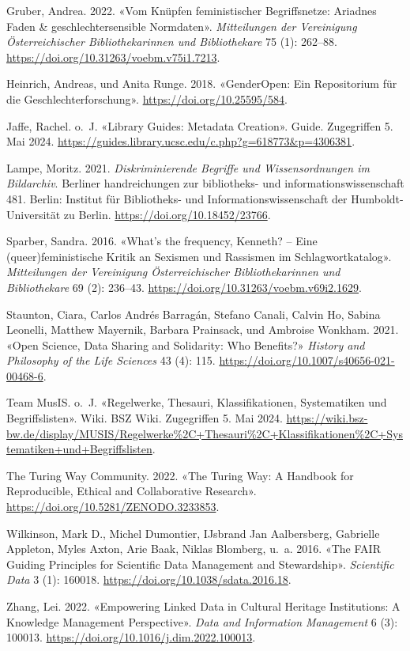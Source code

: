 \documentclass[
  letterpaper,
  DIV=11,
  numbers=noendperiod]{scrartcl}
\newlength{\cslhangindent}
\newenvironment{CSLReferences}[2] %
 {\begin{list}{}{%
  \setlength{\itemindent}{0pt}
  \setlength{\leftmargin}{0pt}
  \setlength{\parsep}{0pt}
  \ifodd #1
   \setlength{\leftmargin}{\cslhangindent}
   \setlength{\itemindent}{-1\cslhangindent}
  \fi
  \setlength{\itemsep}{#2\baselineskip}}}
 {\end{list}}
\begin{document}
\begin{CSLReferences}{1}{0}
Gruber, Andrea. 2022. {«Vom Knüpfen feministischer Begriffsnetze:
Ariadnes Faden \& geschlechtersensible Normdaten»}. \emph{Mitteilungen
der Vereinigung Österreichischer Bibliothekarinnen und Bibliothekare} 75
(1): 262--88. \url{https://doi.org/10.31263/voebm.v75i1.7213}.

Heinrich, Andreas, und Anita Runge. 2018. {«GenderOpen: Ein Repositorium
für die Geschlechterforschung»}. \url{https://doi.org/10.25595/584}.

Jaffe, Rachel. o.~J. {«Library {Guides}: {Metadata Creation}»}. Guide.
Zugegriffen 5. Mai 2024.
\url{https://guides.library.ucsc.edu/c.php?g=618773&p=4306381}.

Lampe, Moritz. 2021. \emph{Diskriminierende Begriffe und
Wissensordnungen im Bildarchiv}. Berliner handreichungen zur
bibliotheks- und informationswissenschaft 481. Berlin: Institut für
Bibliotheks- und Informationswissenschaft der Humboldt-Universität zu
Berlin. \url{https://doi.org/10.18452/23766}.

Sparber, Sandra. 2016. {«What's the frequency, Kenneth? -- Eine
(queer)feministische Kritik an Sexismen und Rassismen im
Schlagwortkatalog»}. \emph{Mitteilungen der Vereinigung Österreichischer
Bibliothekarinnen und Bibliothekare} 69 (2): 236--43.
\url{https://doi.org/10.31263/voebm.v69i2.1629}.

Staunton, Ciara, Carlos Andrés Barragán, Stefano Canali, Calvin Ho,
Sabina Leonelli, Matthew Mayernik, Barbara Prainsack, und Ambroise
Wonkham. 2021. {«Open Science, Data Sharing and Solidarity: Who
Benefits?»} \emph{History and Philosophy of the Life Sciences} 43 (4):
115. \url{https://doi.org/10.1007/s40656-021-00468-6}.

Team MusIS. o.~J. {«Regelwerke, Thesauri, Klassifikationen, Systematiken
und Begriffslisten»}. Wiki. BSZ Wiki. Zugegriffen 5. Mai 2024.
\url{https://wiki.bsz-bw.de/display/MUSIS/Regelwerke\%2C+Thesauri\%2C+Klassifikationen\%2C+Systematiken+und+Begriffslisten}.

The Turing Way Community. 2022. {«The {Turing Way}: {A} Handbook for
Reproducible, Ethical and Collaborative Research»}.
\url{https://doi.org/10.5281/ZENODO.3233853}.

Wilkinson, Mark D., Michel Dumontier, IJsbrand Jan Aalbersberg,
Gabrielle Appleton, Myles Axton, Arie Baak, Niklas Blomberg, u.~a. 2016.
{«The {FAIR Guiding Principles} for Scientific Data Management and
Stewardship»}. \emph{Scientific Data} 3 (1): 160018.
\url{https://doi.org/10.1038/sdata.2016.18}.

Zhang, Lei. 2022. {«Empowering Linked Data in Cultural Heritage
Institutions: {A} Knowledge Management Perspective»}. \emph{Data and
Information Management} 6 (3): 100013.
\url{https://doi.org/10.1016/j.dim.2022.100013}.

\end{CSLReferences}
\end{document}
